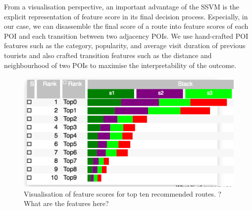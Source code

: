 \documentclass[sigconf]{acmart}
\begin{document}
From a visualisation perspective, an important advantage of the SSVM is the explicit representation of feature score in its final decision process. Especially, in our case, we can disassemble the final score of a route into feature scores of each POI and each transition between two adjacency POIs. We use hand-crafted POI features such as the category, popularity, and average visit duration of previous tourists and also crafted transition features such as the distance and neighbourhood of two POIs to maximise the interpretability of the outcome.

\begin{figure}[t!]
\includegraphics[width=0.9\linewidth]{figure/sample_stack.png}
\caption{Visualisation of feature scores for top ten recommended routes. ?What are the features here?}
\label{fig:stack}
\end{figure}
\end{document}
